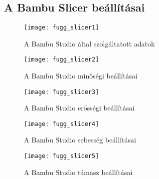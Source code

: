 \appendix
\chapter*{\fuggelek}
\setcounter{chapter}{\appendixnumber}

\section{A Bambu Slicer beállításai}

\begin{figure}[h!]
	\centering
	\texttt{[image: fugg\_slicer1]}
	\caption{A Bambu Studio által szolgáltatott adatok}
	
\end{figure}

\begin{figure}[h!]
	\centering
	\texttt{[image: fugg\_slicer2]}
	\caption{A Bambu Studio minőségi beállításai}
\end{figure}


\begin{figure}[h!]
	\centering
	\texttt{[image: fugg\_slicer3]}
	\caption{A Bambu Studio erősségi beállításai}
\end{figure}

\begin{figure}[h!]
	\centering
	\texttt{[image: fugg\_slicer4]}
	\caption{A Bambu Studio sebesség beállításai}
	
\end{figure}

\begin{figure}[h!]
	\centering
	\texttt{[image: fugg\_slicer5]}
	\caption{A Bambu Studio támasz beállításai}
	
\end{figure}